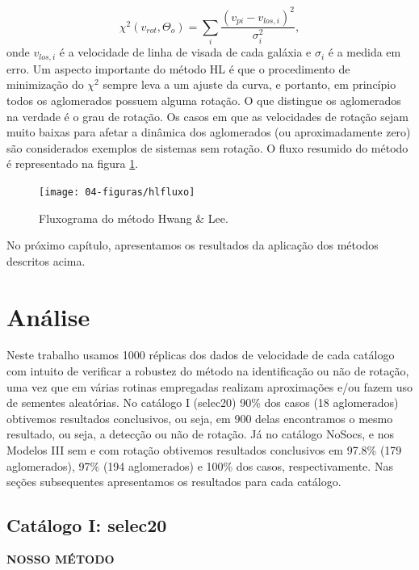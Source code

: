 \begin{equation}
 \chi^2 (v_{rot}, \Theta_o) = \sum_i{\frac{(v_{pi} - v_{los, i})^2}{\sigma^{2}_{i}}} ,
 \label{hwanglee2}
\end{equation}
onde $v_{los, i}$ é a velocidade de linha de visada de cada galáxia e $\sigma_i$ é a medida em erro.
Um aspecto importante do método HL é que o procedimento de minimização do $\chi^2$ sempre leva a um ajuste da curva, e 
portanto, em princípio todos os aglomerados possuem alguma rotação. O que distingue os aglomerados na verdade
é o grau de rotação. Os casos em que as velocidades de rotação sejam muito baixas para afetar a dinâmica dos aglomerados (ou aproximadamente zero)
são considerados exemplos de sistemas sem rotação. O fluxo resumido do método é representado na figura \ref{hlfluxo}.  

\begin{figure}[H] %
\vspace{-2pt}
\begin{center}
\texttt{[image: 04-figuras/hlfluxo]}%
\caption{Fluxograma do método Hwang \& Lee.}
\label{hlfluxo}%
\end{center}
\end{figure}

No próximo capítulo, apresentamos os resultados da aplicação dos métodos descritos acima.

\chapter{Análise}

Neste trabalho usamos 1000 réplicas dos dados de velocidade de cada catálogo com intuito de verificar a robustez do método na identificação ou não de rotação,
uma vez que em várias rotinas empregadas realizam aproximações e/ou fazem uso de sementes aleatórias. No catálogo I (selec20) 90\% dos casos (18 aglomerados) obtivemos resultados conclusivos, ou seja, em 900 delas encontramos o mesmo resultado, ou seja, a detecção ou não de rotação. Já no catálogo NoSocs, e nos Modelos III sem e com rotação obtivemos resultados conclusivos em 97.8\% (179 aglomerados), 97\% (194 aglomerados) e 100\% dos casos, respectivamente. Nas seções subsequentes apresentamos os resultados para cada catálogo.     

\section{Catálogo I: selec20}
\textbf{NOSSO MÉTODO}

